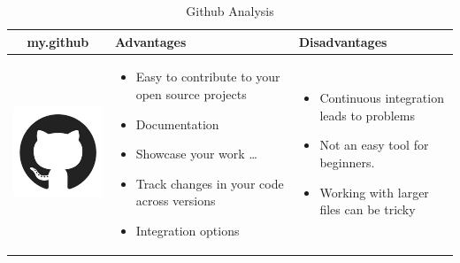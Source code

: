 \documentclass{article}
\begin{document}
\begin{table}[h!]
  \centering
  \begin{tabular}{| c | m{5cm} | m{5cm} |}
  	\hline
	my.github & Advantages & Disadvantages \\ \hline
	\begin{minipage}{.4\textwidth}
		\includegraphics[width=\linewidth, height=40mm]{github}
	\end{minipage}
    &
    \begin{itemize}
    	\item Easy to contribute to your open source projects
    	\item Documentation
    	\item Showcase your work \ldots
    	\item Track changes in your code across versions
    	\item Integration options
    \end{itemize}
    &
    \begin{itemize}
      \item Continuous integration leads to problems
      \item Not an easy tool for beginners.
      \item Working with larger files can be tricky
    \end{itemize}
  \\ \hline
  	\end{tabular}
		\caption{Github Analysis}\label{tbl:mygitHub}
\end{table}
\end{document}
